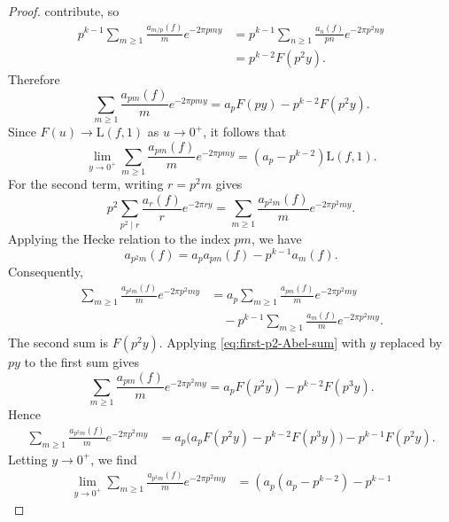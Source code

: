 \documentclass[11pt,table]{amsart}
\numberwithin{equation}{section}
\begin{document}
\begin{proof}
contribute, so
\[
\begin{aligned}
        p^{k-1}
        \sum_{m\geq1}
        \frac{a_{m/p}(f)}m e^{-2\pi pmy}
        &=
        p^{k-1}
        \sum_{n\geq1}
        \frac{a_n(f)}{pn}e^{-2\pi p^2ny} \\
        &=
        p^{k-2}F(p^2y).
\end{aligned}
\]
Therefore
\begin{equation}
\label{eq:first-p2-Abel-sum}
        \sum_{m\geq1}
        \frac{a_{pm}(f)}m e^{-2\pi pmy}
        =
        a_pF(py)-p^{k-2}F(p^2y).
\end{equation}
Since \(F(u)\to\mathrm{L}(f,1)\) as \(u\to0^+\), it follows that
\begin{equation}
\label{eq:first-p2-Abel-limit}
        \lim_{y\to0^+}
        \sum_{m\geq1}
        \frac{a_{pm}(f)}m e^{-2\pi pmy}
        =
        (a_p-p^{k-2})\mathrm{L}(f,1).
\end{equation}
For the second term, writing \(r=p^2m\) gives
\[
        p^2\sum_{p^2\mid r}
        \frac{a_r(f)}r e^{-2\pi ry}
        =
        \sum_{m\geq1}
        \frac{a_{p^2m}(f)}m e^{-2\pi p^2my}.
\]
Applying the Hecke relation to the index \(pm\), we have
\[
        a_{p^2m}(f)
        =
        a_pa_{pm}(f)-p^{k-1}a_m(f).
\]
Consequently,
\[
\begin{aligned}
        \sum_{m\geq1}
        \frac{a_{p^2m}(f)}m e^{-2\pi p^2my}
        &=
        a_p
        \sum_{m\geq1}
        \frac{a_{pm}(f)}m e^{-2\pi p^2my}       \\
        &\quad
        -
        p^{k-1}
        \sum_{m\geq1}
        \frac{a_m(f)}m e^{-2\pi p^2my}.
\end{aligned}
\]
The second sum is \(F(p^2y)\). Applying
\eqref{eq:first-p2-Abel-sum} with \(y\) replaced by \(py\) to the
first sum gives
\[
        \sum_{m\geq1}
        \frac{a_{pm}(f)}m e^{-2\pi p^2my}
        =
        a_pF(p^2y)-p^{k-2}F(p^3y).
\]
Hence
\[
\begin{aligned}
        \sum_{m\geq1}
        \frac{a_{p^2m}(f)}m e^{-2\pi p^2my}
        &=
        a_p
        \bigl(
        a_pF(p^2y)-p^{k-2}F(p^3y)
        \bigr)
        -
        p^{k-1}F(p^2y).
\end{aligned}
\]
Letting \(y\to0^+\), we find
\begin{equation}
\label{eq:second-p2-Abel-limit}
\begin{aligned}
        \lim_{y\to0^+}
        \sum_{m\geq1}
        \frac{a_{p^2m}(f)}m e^{-2\pi p^2my}
        &=
        \left(
        a_p(a_p-p^{k-2})-p^{k-1}

\end{aligned}
\end{equation}
\end{proof}
\end{document}
